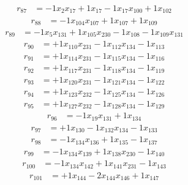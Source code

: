 \[\begin{aligned}
r_{87} &= - 1 x_{2} x_{17} + 1 x_{17} - 1 x_{17} x_{100} + 1 x_{102}
\end{aligned}\]
\[\begin{aligned}
r_{88} &= - 1 x_{104} x_{107} + 1 x_{107} + 1 x_{109}
\end{aligned}\]
\[\begin{aligned}
r_{89} &= - 1 x_{5} x_{131} + 1 x_{105} x_{230} - 1 x_{108} - 1 x_{109} x_{131}
\end{aligned}\]
\[\begin{aligned}
r_{90} &= + 1 x_{110} x_{231} - 1 x_{112} x_{134} - 1 x_{113}
\end{aligned}\]
\[\begin{aligned}
r_{91} &= + 1 x_{114} x_{231} - 1 x_{115} x_{134} - 1 x_{116}
\end{aligned}\]
\[\begin{aligned}
r_{92} &= + 1 x_{117} x_{231} - 1 x_{118} x_{134} - 1 x_{119}
\end{aligned}\]
\[\begin{aligned}
r_{93} &= + 1 x_{120} x_{231} - 1 x_{121} x_{134} - 1 x_{122}
\end{aligned}\]
\[\begin{aligned}
r_{94} &= + 1 x_{123} x_{232} - 1 x_{125} x_{134} - 1 x_{126}
\end{aligned}\]
\[\begin{aligned}
r_{95} &= + 1 x_{127} x_{232} - 1 x_{128} x_{134} - 1 x_{129}
\end{aligned}\]
\[\begin{aligned}
r_{96} &= - 1 x_{19} x_{131} + 1 x_{134}
\end{aligned}\]
\[\begin{aligned}
r_{97} &= + 1 x_{130} - 1 x_{132} x_{134} - 1 x_{133}
\end{aligned}\]
\[\begin{aligned}
r_{98} &= - 1 x_{134} x_{136} + 1 x_{135} - 1 x_{137}
\end{aligned}\]
\[\begin{aligned}
r_{99} &= - 1 x_{134} x_{139} + 1 x_{138} x_{230} - 1 x_{140}
\end{aligned}\]
\[\begin{aligned}
r_{100} &= - 1 x_{134} x_{142} + 1 x_{141} x_{231} - 1 x_{143}
\end{aligned}\]
\[\begin{aligned}
r_{101} &= + 1 x_{144} - 2 x_{144} x_{146} + 1 x_{147}
\end{aligned}\]
